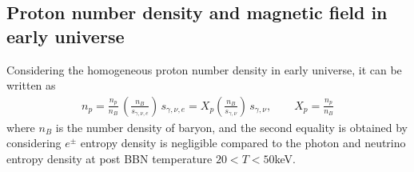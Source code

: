 \documentclass[Universe,article,submit,moreauthors,pdftex]{Definitions/mdpi}
\begin{document}
\subsection{Proton number density and magnetic field in early universe}
Considering the homogeneous proton number density in early universe, it can be written as
\begin{align}\label{density_proton}
n_p=\frac{n_p}{n_B}\,\left(\frac{n_B}{s_{\gamma,\nu,e}}\right)\,s_{\gamma,\nu,e}= X_p\left(\frac{n_B}{s_{\gamma,\nu}}\right)\,s_{\gamma,\nu},\qquad X_p=\frac{n_p}{n_B}
\end{align}
where $n_B$ is the number density of baryon, and the second equality is obtained by considering $e^\pm$ entropy density is negligible compared to the photon and neutrino entropy density at post BBN temperature $20<T<50$keV. 
\end{document}
